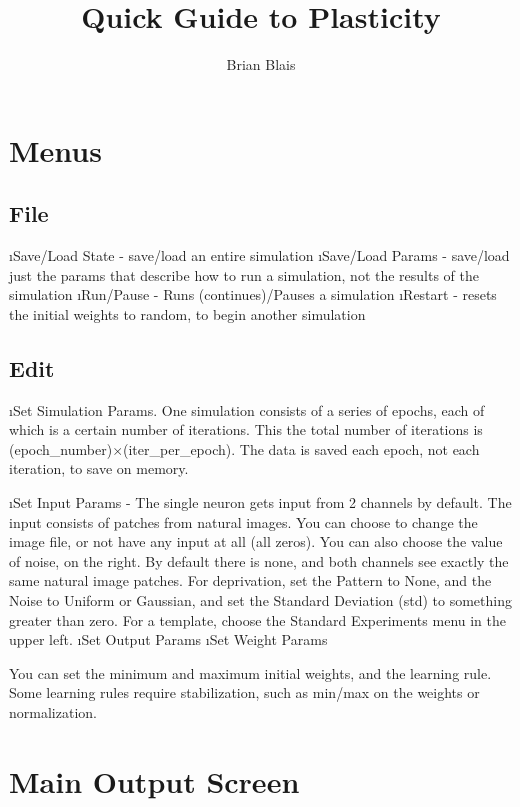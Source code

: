 \documentclass[11pt]{article}
\title{Quick Guide to Plasticity}
\author{Brian Blais}
\date{}                                           %
\begin{document}
\maketitle

\section{Menus}

\subsection{File}

\bi
\i Save/Load State - save/load an entire simulation
\i Save/Load Params - save/load just the params that describe how to run a simulation, not the results of the simulation 
\i Run/Pause - Runs (continues)/Pauses a simulation
\i Restart - resets the initial weights to random, to begin another simulation
\ei

\subsection{Edit}

\bi
\i Set Simulation Params.  One simulation consists of a series of epochs, each of which is a certain number of iterations.  This the total number of iterations is (epoch\_number)$\times$(iter\_per\_epoch).  The data is saved each epoch, not each iteration, to save on memory.

\i Set Input Params - The single neuron gets input from 2 channels by default.  The input consists of patches from natural images.  You can choose to change the image file, or not have any input at all (all zeros).  You can also choose the value of noise, on the right.  By default there is none, and both channels see exactly the same natural image patches.  For deprivation, set the Pattern to None, and the Noise to Uniform or Gaussian, and set the Standard Deviation (std) to something greater than zero.  For a template, choose the Standard Experiments menu in the upper left.
\i Set Output Params 
\i Set Weight Params

You can set the minimum and maximum initial weights, and the learning rule.  Some learning rules require stabilization, such as min/max on the weights or normalization.  



\ei



\section{Main Output Screen}


\end{document}
